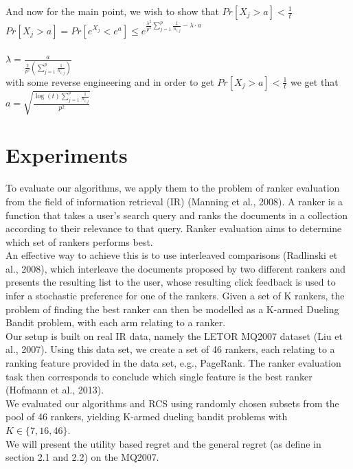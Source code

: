 \documentclass{llncs}
\begin{document}
		And now for the main point, we wish to show that 
		$Pr[X_j > a] < \frac{1}{t}$\\
		$Pr[X_j > a] = Pr[e^{X_j} < e^a] \leq e^{
						   \frac{\lambda^2}{p^2}
						   \sum\limits_{j=1}^{p} \frac{1}{n_{i,j}}
						   - \lambda\cdot a}$
		\\
		\\
		$\lambda = \frac{a}{\frac{2}{p^2}\left( \sum\limits_{j=1}^{p} \frac{1}{n_{i,j}} \right)} $ 
		\\
		with some reverse engineering and in order to get $Pr[X_j > a] < \frac{1}{t}$ we get that $a = \sqrt{\frac{\log(t) \sum\limits_{j=1}^{p} \frac{1}{n_{i,j}}}{p^2}}$ 
 
 
	
		
\section{Experiments}

To evaluate our algorithms, we apply them to the problem of
ranker evaluation from the field of information retrieval
(IR) (Manning et al., 2008). A ranker is a
function that takes a user's search query and
ranks the documents in a collection according to their
relevance to that query. Ranker evaluation aims to determine
which set of rankers performs best.
\\
An effective way to achieve this is to use interleaved
comparisons (Radlinski et al., 2008), which interleave
the documents proposed by two different rankers and
presents the resulting list to the user, whose resulting
click feedback is used to infer a stochastic preference
for one of the rankers. Given a set of K rankers, the
problem of finding the best ranker can then be modelled 
as a K-armed Dueling Bandit problem, with each
arm relating to a ranker.
\\
Our setup is built on real IR data,
namely the LETOR MQ2007 dataset (Liu et al., 2007).
Using this data set, we create a set of 46 rankers, each
relating to a ranking feature provided in the
data set, e.g., PageRank. The ranker evaluation task
then corresponds to conclude which single feature
is the best ranker (Hofmann et al., 2013).
\\
We evaluated our algorithms and RCS
using randomly chosen subsets from the pool of 46
rankers, yielding K-armed dueling bandit problems
with $K\in \{7, 16, 46\}$. 
\\
We will present the utility based regret and the general regret (as define in section 2.1 and 2.2) on the MQ2007. 
\newpage
\end{document}
